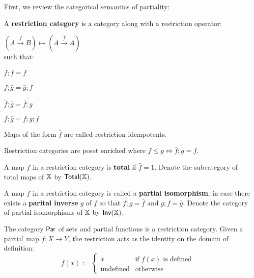 First, we review the categorical semantics of partiality:
\label{sec:rest}
\begin{definition}\cite[\S 2.1.1]{cockett}
A {\bf restriction category} is a category along with a restriction operator:

\hfil
$
(A \xrightarrow{f} B )\mapsto (A \xrightarrow{\bar f} A)
$\\
such that:
\begin{multicols}{2}
\begin{enumerate}[label={\bf [R.\arabic*]}, ref={\bf [R.\arabic*]}]
\item $\bar f ; f  = f$
\label{R.1}
\item $\bar f ; \bar g = \bar g ; \bar f$
\label{R.2}
\item $\bar f ; \bar g = \bar{\bar f ;  g}$
\label{R.3}
\item $f ; \bar g = \bar{f; g} ; f$
\label{R.4}
\end{enumerate}
\end{multicols}
Maps of the form $\bar f$ are called restriction idempotents.

Restriction categories are poset enriched where $f \leq g \iff \bar f ; g = f$.




A map $f$ in a restriction category is {\bf total} if $\bar f =1$.  Denote the subcategory of total maps of $\mathbb{X}$ by $\mathsf{Total}(\mathbb{X})$.



A map $f$ in a restriction category is called a {\bf partial isomorphism}, in case there exists a {\bf parital inverse} $g$ of $f$ so that $f;g=\bar f$ and $g;f = \bar g$. Denote the category of partial isomorphisms of $\mathbb{X}$ by $\mathsf{Inv}(\mathbb{X})$.
\end{definition}
\begin{example}
The category $\mathsf{Par}$ of sets and partial functions is a restriction category.   Given a partial map $f:X\to Y$, the restriction acts as the identity on the domain of definition:
$$
\bar f (x):=
\begin{cases}
x & \text{if }f(x)\text{ is defined}\\
\text{undefined} & \text{otherwise}
\end{cases}
$$
\end{example}
%
